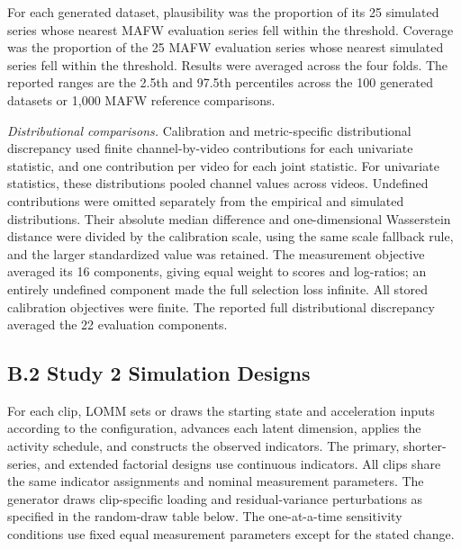 \documentclass[
]{article}
\begin{document}
For each generated dataset, plausibility was the proportion of its 25
simulated series whose nearest MAFW evaluation series fell within the
threshold. Coverage was the proportion of the 25 MAFW evaluation series
whose nearest simulated series fell within the threshold. Results were
averaged across the four folds. The reported ranges are the 2.5th and
97.5th percentiles across the 100 generated datasets or 1,000 MAFW
reference comparisons.

\emph{Distributional comparisons.} Calibration and metric-specific
distributional discrepancy used finite channel-by-video contributions
for each univariate statistic, and one contribution per video for each
joint statistic. For univariate statistics, these distributions pooled
channel values across videos. Undefined contributions were omitted
separately from the empirical and simulated distributions. Their
absolute median difference and one-dimensional Wasserstein distance were
divided by the calibration scale, using the same scale fallback rule,
and the larger standardized value was retained. The measurement
objective averaged its 16 components, giving equal weight to scores and
log-ratios; an entirely undefined component made the full selection loss
infinite. All stored calibration objectives were finite. The reported
full distributional discrepancy averaged the 22 evaluation components.

\subsection{B.2 Study 2 Simulation
Designs}\label{b.2-study-2-simulation-designs}

For each clip, LOMM sets or draws the starting state and acceleration
inputs according to the configuration, advances each latent dimension,
applies the activity schedule, and constructs the observed indicators.
The primary, shorter-series, and extended factorial designs use
continuous indicators. All clips share the same indicator assignments
and nominal measurement parameters. The generator draws clip-specific
loading and residual-variance perturbations as specified in the
random-draw table below. The one-at-a-time sensitivity conditions use
fixed equal measurement parameters except for the stated change.
\end{document}
